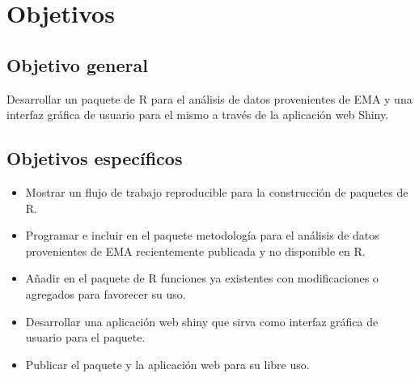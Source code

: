 \chapter{Objetivos}
\section{Objetivo general}
 
Desarrollar un paquete de R para el análisis de datos provenientes de EMA y una interfaz gráfica de usuario para el mismo a través de la aplicación web Shiny.


\section{Objetivos específicos}
\begin{itemize}
\item Mostrar un flujo de trabajo reproducible para la construcción de paquetes de R.
\item Programar e incluir en el paquete metodología para el análisis de datos provenientes de EMA recientemente publicada y no disponible en R.
\item Añadir en el paquete de R funciones ya existentes con modificaciones o agregados para favorecer su uso.
\item Desarrollar una aplicación web shiny que sirva como interfaz gráfica de usuario para el paquete.
\item Publicar el paquete y la aplicación web para su libre uso.
\end{itemize}

